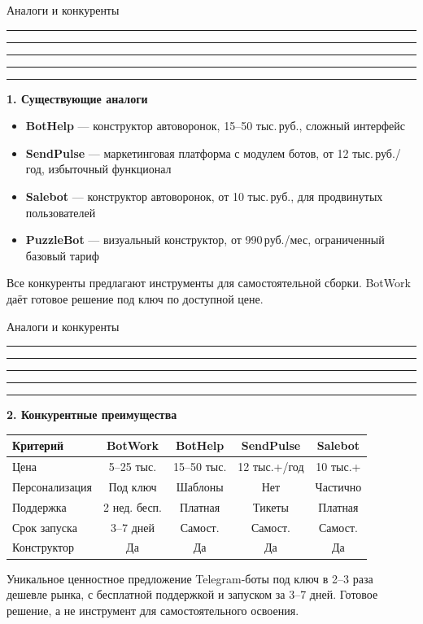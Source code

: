 \documentclass[aspectratio=169, 11pt]{beamer}
\newcommand{\cbar}{%
  \textcolor{cPink}{\rule{0.2\linewidth}{2pt}}%
  \textcolor{cPurple}{\rule{0.2\linewidth}{2pt}}%
  \textcolor{cRed}{\rule{0.2\linewidth}{2pt}}%
  \textcolor{cOrange}{\rule{0.2\linewidth}{2pt}}%
  \textcolor{cBlue}{\rule{0.2\linewidth}{2pt}}\par\medskip}
\newcommand{\R}{\,руб.}
\begin{document}
\begin{frame}{Аналоги и конкуренты}
\cbar
\textbf{1. Существующие аналоги}

\begin{itemize}\setlength\itemsep{3pt}
  \item \textbf{BotHelp} --- конструктор автоворонок, 15--50 тыс.\R, сложный интерфейс
  \item \textbf{SendPulse} --- маркетинговая платформа с модулем ботов, от 12 тыс.\R/год, избыточный функционал
  \item \textbf{Salebot} --- конструктор автоворонок, от 10 тыс.\R, для продвинутых пользователей
  \item \textbf{PuzzleBot} --- визуальный конструктор, от 990\R/мес, ограниченный базовый тариф
\end{itemize}

\medskip
\textcolor{cRed}{Все конкуренты предлагают инструменты для самостоятельной сборки. BotWork даёт готовое решение \guillemotleft{}под ключ\guillemotright{} по доступной цене.}
\end{frame}

\begin{frame}{Аналоги и конкуренты}
\cbar
\textbf{2. Конкурентные преимущества}

\smallskip
\centering
\footnotesize
\begin{tabular}{lcccc}
\toprule
\textbf{Критерий} & \textbf{BotWork} & BotHelp & SendPulse & Salebot \\
\midrule
Цена & \textcolor{cRed}{5--25 тыс.} & 15--50 тыс. & 12 тыс.+/год & 10 тыс.+ \\
Персонализация & \textcolor{cRed}{Под ключ} & Шаблоны & Нет & Частично \\
Поддержка & \textcolor{cRed}{2 нед. бесп.} & Платная & Тикеты & Платная \\
Срок запуска & \textcolor{cRed}{3--7 дней} & Самост. & Самост. & Самост. \\
Конструктор & Да & Да & Да & Да \\
\bottomrule
\end{tabular}

\raggedright
\medskip
\begin{block}{Уникальное ценностное предложение}
Telegram-боты \guillemotleft{}под ключ\guillemotright{} в 2--3 раза дешевле рынка, с бесплатной поддержкой и запуском за 3--7 дней. Готовое решение, а не инструмент для самостоятельного освоения.
\end{block}
\end{frame}
\end{document}
